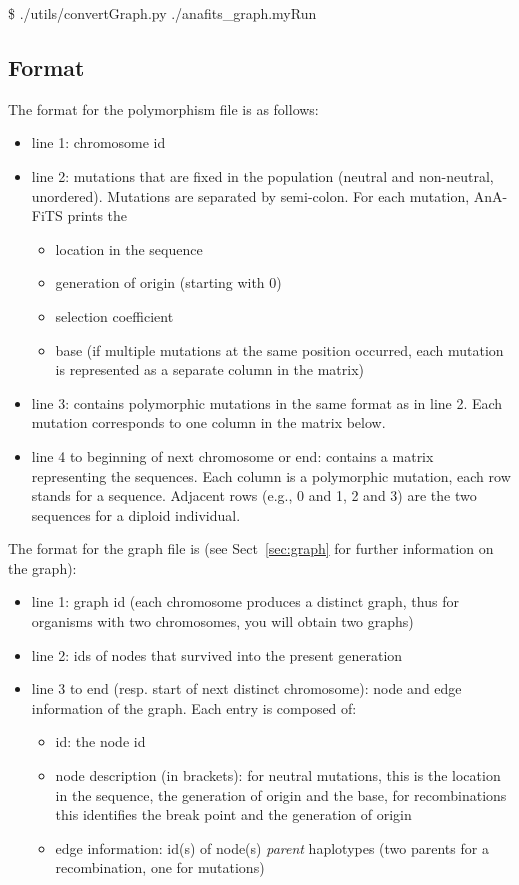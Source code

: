 \documentclass{scrartcl}
\begin{document}
\$ ./utils/convertGraph.py ./anafits\_graph.myRun

\subsection{Format}

The format for the polymorphism file is as follows: 
\begin{itemize}
\item line 1: chromosome id 
\item line 2: mutations that are fixed in the population (neutral and non-neutral, unordered).
  Mutations are separated by semi-colon. For each mutation, AnA-FiTS
  prints the 
  \begin{itemize}
  \item location in the sequence
  \item generation of origin (starting  with 0)
  \item selection coefficient 
  \item base (if multiple mutations at the same position occurred,
    each mutation is represented as a separate column in the matrix)
  \end{itemize}
\item line 3: contains polymorphic mutations in the same format as in
  line 2. Each mutation corresponds to one column in the matrix
  below. 
\item line 4 to beginning of next chromosome or end: contains a matrix
  representing the sequences. Each column is a polymorphic mutation,
  each row stands for a sequence. Adjacent rows (e.g., 0 and 1, 2 and
  3) are the two sequences for a diploid individual. 
\end{itemize}


The format for the graph file is (see Sect~\ref{sec:graph} for further
information on the graph): 
\begin{itemize}
\item line 1: graph id (each chromosome produces a distinct graph,
  thus for organisms with two chromosomes, you will obtain two graphs)
\item line 2: ids of nodes that survived into the present generation
\item line 3 to end (resp. start of next distinct chromosome): node
  and edge information of the graph. Each entry is composed of: 
  \begin{itemize}
  \item id: the node id
  \item node description (in brackets): for neutral mutations, this is
    the location in the sequence, the generation of origin and the
    base, for recombinations this identifies the break point and the
    generation of origin
  \item edge information: id(s) of node(s) \textit{parent} haplotypes
    (two parents for a recombination, one for mutations)
  \end{itemize}   
\end{itemize}
\end{document}
